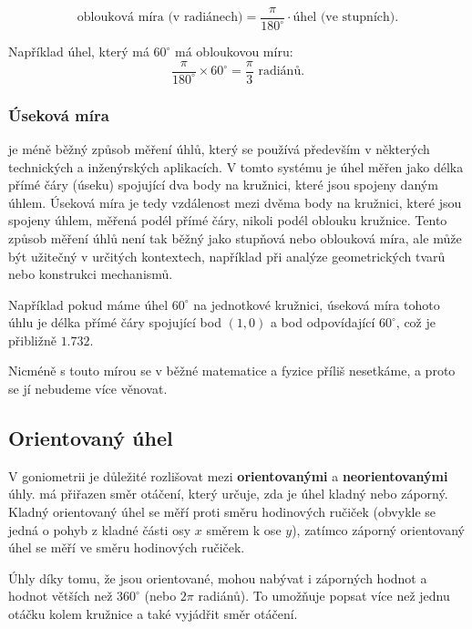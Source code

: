 \documentclass[12pt,a4paper]{article}
\begin{document}
\begin{definitionbox}
\[\text{oblouková míra (v radiánech)} = \frac{\pi}{180^\circ} \cdot \text{úhel (ve stupních)}.\]
\end{definitionbox}

\begin{examplebox}
Například úhel, který má $60^\circ$ má obloukovou míru:
\[\frac{\pi}{180^\circ} \times 60^\circ = \frac{\pi}{3} \text{ radiánů}.\]
\end{examplebox}


\subsubsection*{Úseková míra}
 je méně běžný způsob měření úhlů, který se používá především v některých technických a inženýrských aplikacích. 
V tomto systému je úhel měřen jako délka přímé čáry (úseku) spojující dva body na kružnici, které jsou spojeny daným úhlem.
Úseková míra je tedy vzdálenost mezi dvěma body na kružnici, které jsou spojeny úhlem, měřená podél přímé čáry, nikoli podél oblouku kružnice.
Tento způsob měření úhlů není tak běžný jako stupňová nebo oblouková míra, ale může být užitečný v určitých kontextech, například při analýze geometrických tvarů nebo konstrukci mechanismů.

\begin{examplebox}
Například pokud máme úhel $60^\circ$ na jednotkové kružnici, úseková míra tohoto úhlu je délka přímé čáry spojující bod $(1,0)$ a bod odpovídající $60^\circ$, což je přibližně $1.732$.
\end{examplebox}

Nicméně s touto mírou se v běžné matematice a fyzice příliš nesetkáme, a proto se jí nebudeme více věnovat.



\subsection*{Orientovaný úhel}

V goniometrii je důležité rozlišovat mezi \textbf{orientovanými} a \textbf{neorientovanými} úhly.
 má přiřazen směr otáčení, který určuje, zda je úhel kladný nebo záporný.
Kladný orientovaný úhel se měří proti směru hodinových ručiček (obvykle se jedná o pohyb z kladné části osy $x$ směrem k ose $y$),
zatímco záporný orientovaný úhel se měří ve směru hodinových ručiček.

Úhly díky tomu, že jsou orientované, mohou nabývat i záporných hodnot a hodnot větších než $360^\circ$ (nebo $2\pi$ radiánů).
To umožňuje popsat více než jednu otáčku kolem kružnice a také vyjádřit směr otáčení.
\end{document}
